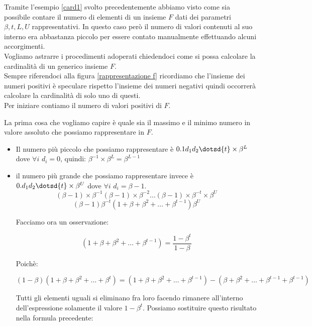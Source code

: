 \documentclass[12pt, a4paper]{book}
\theoremstyle{definition}
\begin{document}
\begin{flushleft}

Tramite l'esempio \ref{card1} svolto precedentemente abbiamo visto come sia possibile contare il numero di elementi di un insieme $F$ dati dei  parametri $\beta, t, L,U$ rappresentativi.  In questo caso però il numero di valori contenuti al suo interno era abbastanza piccolo per essere contato manualmente effettuando alcuni accorgimenti.\\
Vogliamo astrarre i procedimenti adoperati chiedendoci come si possa calcolare la cardinalità di un generico insieme $F$.\\
\vspace{1em}
Sempre riferendoci alla figura \ref{rappresentazione f} ricordiamo che l'insieme dei numeri positivi è speculare rispetto l'insieme dei numeri negativi quindi occorrerà calcolare la cardinalità di solo uno di questi.\\

Per iniziare contiamo il numero di valori positivi di $F$. 

La prima cosa che vogliamo capire è quale sia il massimo e il minimo numero in valore assoluto che possiamo rappresentare in $F$.  \\
\begin{itemize}
	\item Il numero più piccolo che possiamo rappresentare è $0.1d_{1}d_{2}\dotsd{t} \times \beta^{L}$ dove $\forall i $ $d_{i} = 0$, quindi: $\beta^{-1}\times\beta^{L}=\beta^{L-1}$ 
	\item il numero più grande che possiamo rappresentare invece è $0.d_{1}d_{2}\dotsd{t} \times \beta^{U}$ dove $\forall i $ $d_{i} = \beta - 1$. 
\[ (\beta -1)\times\beta^{-1}(\beta -1)\times\beta^{-2}\dots(\beta -1)\times\beta^{-t} \times \beta^{U} \]
\[ (\beta -1) \beta^{-t}(1 + \beta + \beta^{2} +\dots+ \beta^{t-1})\beta^{U} \]

Facciamo ora un osservazione:

\[ (1 + \beta + \beta^{2} +\dots+ \beta^{t-1})  = \frac{1-\beta^{t}}{1-\beta}\]

Poichè:

\[ (1-\beta)(1 + \beta + \beta^{2} +\dots+ \beta^{t}) = (1 + \beta + \beta^{2} +\dots+ \beta^{t-1}) - (\beta + \beta^{2} +\dots+ \beta^{t-1} + \beta^{t-1}) \]

Tutti gli elementi uguali si eliminano fra loro facendo rimanere all'interno dell'espressione solamente il valore $1-\beta^{t}$. Possiamo sostituire questo risultato nella formula precedente: 


\end{itemize}
\end{flushleft}
\end{document}
